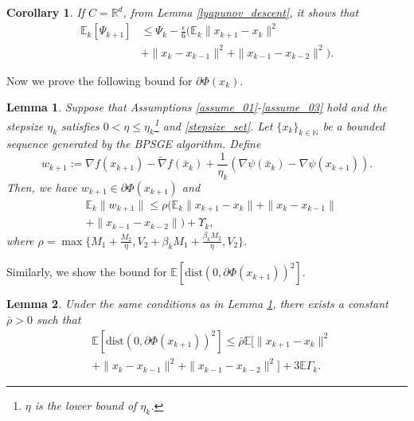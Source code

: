 \documentclass[letterpaper]{article} %
\newtheorem{lemma}{Lemma}
\newtheorem{corollary}{Corollary}
\begin{document}
	\begin{corollary}\label{lemma_Phi_kk1_Rd}
		If $C=\mathbb{R}^{d}$,  from Lemma \ref{lyapunov_descent}, it shows that
		\begin{align*}
			\mathbb{E}_{k}[\Psi_{k+1}]&\le \Psi_{k}-\frac{\epsilon}{6}(\mathbb{E}_{k}\|x_{k+1}-x_{k}\|^{2}\\
			&+\|x_{k}-x_{k-1}\|^{2}+\|x_{k-1}-x_{k-2}\|^{2}).
		\end{align*}
	\end{corollary}
	Now we prove the following bound for   $\partial\Phi(x_{k})$.
	\begin{lemma} \label{subgradient_bound}
		Suppose that Assumptions \ref{assume_01}-\ref{assume_03} hold and the stepsize $\eta_{k}$ satisfies $0<\eta\le \eta_{k}$\footnote{$\eta$ is the lower bound of $\eta_{k}$.} and \eqref{stepsize_set}. Let $\{x_{k}\}_{k\in\mathbb{N}}$ be a bounded sequence generated by the BPSGE algorithm. Define
		\[
		w_{k+1}:=\nabla f(x_{k+1})-\tilde{\nabla}f(\bar{x}_{k})+\frac{1}{\eta_{k}}(\nabla \psi(\bar{x}_{k})-\nabla \psi(x_{k+1})).
		\]
		Then, we have $w_{k+1}\in\partial \Phi(x_{k+1})$ and 
		\begin{align*}
			&\mathbb{E}_{k}\|w_{k+1}\|
			\le\rho(\mathbb{E}_{k}\|x_{k+1}-x_{k}\|+\|x_{k}-x_{k-1}\|\\
			&+\|x_{k-1}-x_{k-2}\|) +\Upsilon_{k},
		\end{align*}
		where $\rho=\max\{M_{1}+\frac{M_{2}}{\eta}, V_{2}+\beta_{k}M_{1}+\frac{\beta_{k}M_{2}}{\eta}, V_{2}\}$.
	\end{lemma}
	
	Similarly,  we show the   bound for   $\mathbb{E}[\mathrm{dist}(0,\partial\Phi(x_{k+1}))^{2}]$.
	\begin{lemma}\label{lemma_dist2}
		Under the same conditions as in Lemma \ref{subgradient_bound}, there exists a constant $\bar{\rho}>0$ such that
		\begin{align*}
			&\mathbb{E}[\mathrm{dist}(0,\partial\Phi(x_{k+1}))^{2}]
			\le\bar{\rho}\mathbb{E}[\|x_{k+1}-x_{k}\|^{2}\\
			&+\|x_{k}-x_{k-1}\|^{2}+\|x_{k-1}-x_{k-2}\|^{2}] +3\mathbb{E}\Gamma_{k}.
		\end{align*}
	\end{lemma}
	
\end{document}
